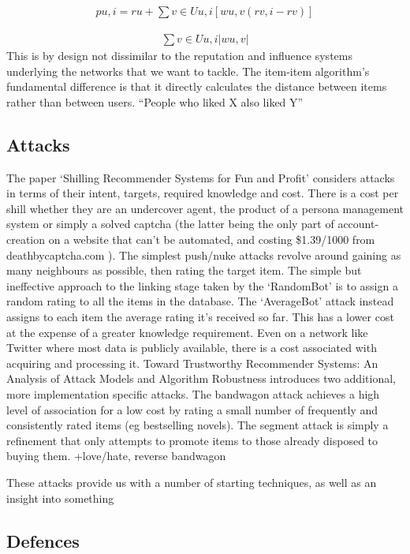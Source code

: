 \begin{align*}
pu,i = ru +       ∑v∈Uu,i [wu,v (rv,i − rv )]
\end{align*}

\begin{align*}
∑v∈Uu,i |wu,v |
\end{align*}
This is by design not dissimilar to the reputation and influence systems underlying the networks that we want to tackle. The item-item algorithm’s fundamental difference is that it directly calculates the distance between items rather than between users. “People who liked X also liked Y”

\subsection{Attacks}

The paper `Shilling Recommender Systems for Fun and Profit' considers attacks in terms of their intent, targets, required knowledge and cost. There is a cost per shill whether they are an undercover agent, the product of a persona management system or simply a solved captcha (the latter being the only part of account-creation on a website that can't be automated, and costing \$1.39/1000 from deathbycaptcha.com ). The simplest push/nuke attacks revolve around gaining as many neighbours as possible, then rating the target item. The simple but ineffective approach to the linking stage taken by the `RandomBot' is to assign a random rating to all the items in the database. The `AverageBot' attack instead assigns to each item the average rating it's received so far. This has a lower cost at the expense of a greater knowledge requirement. Even on a network like Twitter where most data is publicly available, there is a cost associated with acquiring and processing it. Toward Trustworthy Recommender Systems: An Analysis of Attack Models and Algorithm Robustness introduces two additional, more implementation specific attacks. The bandwagon attack achieves a high level of association for a low cost by rating a small number of frequently and consistently rated items (eg bestselling novels).  The segment attack is simply a refinement that only attempts to promote items to those already disposed to buying them. +love/hate, reverse bandwagon

These attacks provide us with a number of starting techniques, as well as an insight into something

\subsection{Defences}

